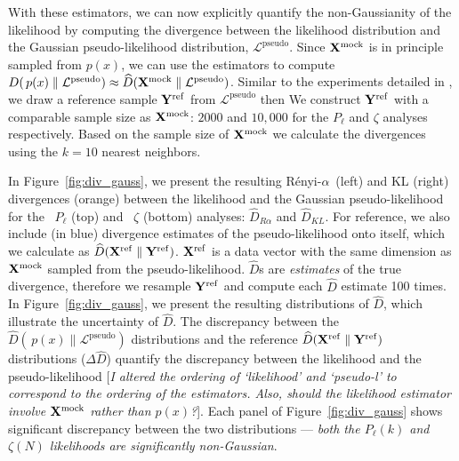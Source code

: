 \documentclass[12pt, letterpaper, preprint]{aastex}
\newcommand{\Nd}{{100}\xspace}
\newcommand{\Xmock}{{\bf X}^\mathrm{mock}}
\newcommand{\Xref}{{\bf X}^\mathrm{ref}}
\newcommand{\Yref}{{\bf Y}^\mathrm{ref}}
\newcommand{\Ralpha}{R\'enyi-$\alpha$}
\newcommand{\Beut}{\citetalias{beutler2017}\xspace}
\newcommand{\Sinh}{\citetalias{sinha2017}\xspace}
\newcommand{\ms}[1]{{\color{orange}{\bf MS:}} {[\em #1}]}
\begin{document}
With these estimators, we can now explicitly quantify the 
non-Gaussianity of the likelihood by computing the divergence 
between the likelihood distribution and the Gaussian 
pseudo-likelihood distribution, $\mathcal{L}^\mathrm{pseudo}$.
Since $\Xmock$ is in principle sampled from $p(x)$, we can use the 
estimators to compute 
$D(\, p(x) \parallel \mathcal{L}^\mathrm{pseudo}) \approx \widehat{D}(\Xmock \parallel \mathcal{L}^\mathrm{pseudo})$. %
Similar to the experiments detailed in \cite{poczos2012},
we draw a reference sample ${\bf Y}^\mathrm{ref}$ from 
$\mathcal{L}^\mathrm{pseudo}$ then %
We construct ${\bf Y}^\mathrm{ref}$ with a comparable sample size as $\Xmock$: 
$2000$ and $10,000$ for the $P_\ell$ and $\zeta$ analyses respectively. 
Based on the sample size of $\Xmock$ we calculate the divergences using 
the $k=10$ nearest neighbors. 

In Figure~\ref{fig:div_gauss}, we present the resulting \Ralpha~(left) 
and KL (right) divergences (orange) between the likelihood and the 
Gaussian pseudo-likelihood for the \Beut~$P_\ell$ (top) and \Sinh~$\zeta$ (bottom) 
analyses: $\widehat{D}_{R\alpha}$ and $\widehat{D}_{KL}$. For reference, we also 
include (in blue) divergence estimates of the pseudo-likelihood onto itself, 
which we calculate as $\widehat{D}(\Xref \parallel \Yref)$. $\Xref$ is a 
data vector with the same dimension as $\Xmock$ sampled from the pseudo-likelihood. 
$\widehat{D}$s are \emph{estimates} of the true divergence, therefore we 
resample $\Yref$ and compute each $\widehat{D}$ estimate \Nd times. 
In Figure~\ref{fig:div_gauss}, we present the resulting distributions of $\widehat{D}$,
which illustrate the uncertainty of $\widehat{D}$. The discrepancy between 
the $\widehat{D}(\, p(x) \parallel \mathcal{L}^\mathrm{pseudo})$
distributions and the reference $\widehat{D}(\Xref \parallel \Yref)$ distributions 
($\Delta \widehat{D}$) quantify the discrepancy between the likelihood
and the pseudo-likelihood\ms{I altered the ordering of `likelihood' and `pseudo-l' to
  correspond to the ordering of the estimators. Also, should the likelihood
  estimator involve $\Xmock$ rather than $p(x)$?}. Each panel of Figure~\ref{fig:div_gauss} shows significant 
discrepancy between the two distributions --- \emph{both 
the $P_\ell(k)$ and $\zeta(N)$ likelihoods are significantly non-Gaussian}. 
\end{document}
